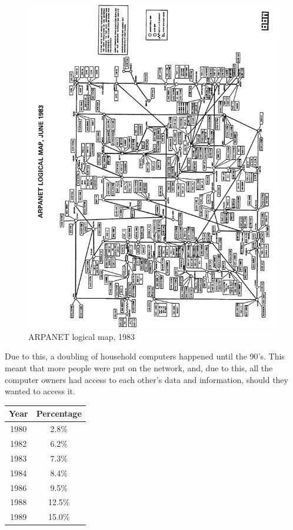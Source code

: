 \begin{figure}[htbp]
    \centering
    \includegraphics[angle=270,scale=0.35]{pictures/arpanet.png}
    \caption{ARPANET logical map, 1983}
    \label{arpanetLogicaMap}
\end{figure}


\par
Due to this, a doubling of household computers happened until the 90's.
This meant that more people were put on the network, and, due to this, all the computer owners had access to each other's data and information, should they wanted to access it.

\begin{center}
    \begin{tabular}{|| c | c ||}
          \hline
          \textbf{Year} & \textbf{Percentage} \\
          \hline
          1980 & 2.8\% \\
          \hline
          1982 & 6.2\% \\
          \hline
          1983 & 7.3\% \\
          \hline
          1984 & 8.4\% \\
          \hline
          1986 & 9.5\% \\
          \hline
          1988 & 12.5\% \\
          \hline
          1989 & 15.0\% \\
          \hline
    \end{tabular}
\end{center}

